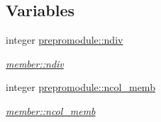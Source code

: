 \subsection*{Variables}
\begin{DoxyCompactItemize}
\item 
integer \hyperlink{namespaceprepromodule_a6339275501f8c1e8f0b418c9e918005e}{prepromodule\+::ndiv}
\begin{DoxyCompactList}\small\item\em \hyperlink{namespacemember_a3e6a3b0896edb5c30c113dc22ab7181a}{member\+::ndiv} \end{DoxyCompactList}\item 
integer \hyperlink{namespaceprepromodule_a41d66ef3ffc050f01bc1763c62c6f3e1}{prepromodule\+::ncol\+\_\+memb}
\begin{DoxyCompactList}\small\item\em \hyperlink{namespacemember_a20895477b227a3352a4e758b21b01bf8}{member\+::ncol\+\_\+memb} \end{DoxyCompactList}\end{DoxyCompactItemize}
